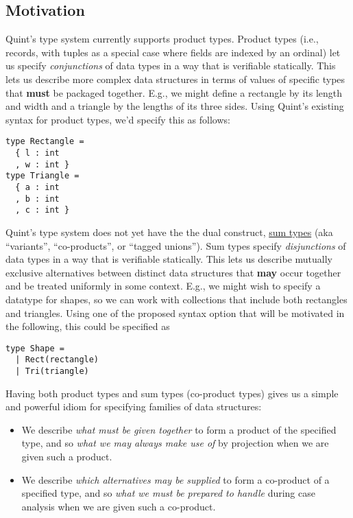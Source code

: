 \documentclass[11pt]{article}
\begin{document}
\subsection{Motivation}
\label{sec:orga2ffa06}
Quint's type system currently supports product types. Product types
(i.e., records, with tuples as a special case where fields are indexed
by an ordinal) let us specify \emph{conjunctions} of data types in a way that
is verifiable statically. This lets us describe more complex data
structures in terms of values of specific types that \textbf{must} be packaged
together. E.g., we might define a rectangle by its length and width and
a triangle by the lengths of its three sides. Using Quint's existing
syntax for product types, we'd specify this as follows:

\begin{verbatim}
type Rectangle = 
  { l : int
  , w : int }
type Triangle = 
  { a : int
  , b : int
  , c : int }
\end{verbatim}

Quint's type system does not yet have the the dual construct,
\href{https://en.wikipedia.org/wiki/Tagged\_union}{sum types} (aka
``variants'', ``co-products'', or ``tagged unions''). Sum types specify
\emph{disjunctions} of data types in a way that is verifiable statically.
This lets us describe mutually exclusive alternatives between distinct
data structures that \textbf{may} occur together and be treated uniformly in
some context. E.g., we might wish to specify a datatype for shapes, so
we can work with collections that include both rectangles and triangles.
Using one of the proposed syntax option that will be motivated in the
following, this could be specified as

\begin{verbatim}
type Shape =
  | Rect(rectangle)
  | Tri(triangle)
\end{verbatim}

Having both product types and sum types (co-product types) gives us a
simple and powerful idiom for specifying families of data structures:

\begin{itemize}
\item We describe \emph{what must be given together} to form a product of the
specified type, and so \emph{what we may always make use of} by projection
when we are given such a product.
\item We describe \emph{which alternatives may be supplied} to form a co-product
of a specified type, and so \emph{what we must be prepared to handle}
during case analysis when we are given such a co-product.
\end{itemize}
\end{document}
